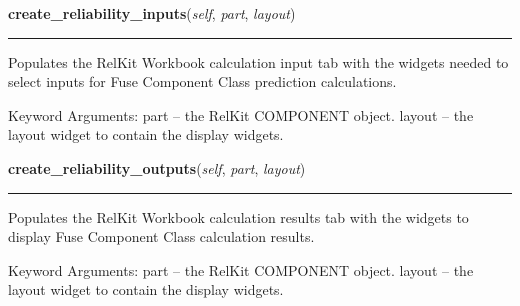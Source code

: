     \label{reliafree:miscellaneous:fuse:Fuse:create_reliability_inputs}

    \vspace{0.5ex}

\hspace{.8\funcindent}\begin{boxedminipage}{\funcwidth}

    \raggedright \textbf{create\_reliability\_inputs}(\textit{self}, \textit{part}, \textit{layout})

    \vspace{-1.5ex}

    \rule{\textwidth}{0.5\fboxrule}
\setlength{\parskip}{2ex}
    Populates the RelKit Workbook calculation input tab with the widgets
    needed to select inputs for Fuse Component Class prediction 
    calculations.

    Keyword Arguments: part   -- the RelKit COMPONENT object. layout -- 
    the layout widget to contain the display widgets.

\setlength{\parskip}{1ex}
    \end{boxedminipage}

    \label{reliafree:miscellaneous:fuse:Fuse:create_reliability_outputs}

    \vspace{0.5ex}

\hspace{.8\funcindent}\begin{boxedminipage}{\funcwidth}

    \raggedright \textbf{create\_reliability\_outputs}(\textit{self}, \textit{part}, \textit{layout})

    \vspace{-1.5ex}

    \rule{\textwidth}{0.5\fboxrule}
\setlength{\parskip}{2ex}
    Populates the RelKit Workbook calculation results tab with the 
    widgets to display Fuse Component Class calculation results.

    Keyword Arguments: part   -- the RelKit COMPONENT object. layout -- 
    the layout widget to contain the display widgets.

\setlength{\parskip}{1ex}
    \end{boxedminipage}

